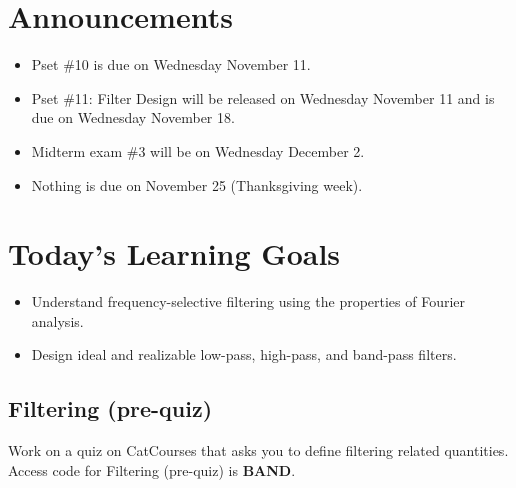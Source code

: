 \section{Announcements}
\begin{itemize}
    \item Pset \#10 is due on Wednesday November 11.
    \item Pset \#11: Filter Design will be released on Wednesday November 11 and is due on Wednesday November 18.
    \item Midterm exam \#3 will be on Wednesday December 2.
    \item Nothing is due on November 25 (Thanksgiving week).
\end{itemize}

\section{Today's Learning Goals}
\begin{itemize}
    \item Understand frequency-selective filtering using the properties of Fourier analysis.
    \item Design ideal and realizable low-pass, high-pass, and band-pass filters.
\end{itemize}
\subsection{Filtering (pre-quiz)}
Work on a quiz on CatCourses that asks you to define filtering related quantities. Access code for Filtering (pre-quiz) is \textbf{BAND}.

